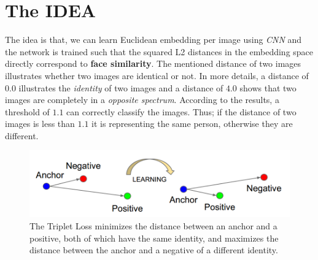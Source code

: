 \documentclass[journal, a4paper]{IEEEtran}
\begin{document}
\section{The IDEA}
	The idea is that, we can learn Euclidean embedding per image using \textit{CNN} and the network is trained such that the squared L2 distances in the embedding space directly correspond to \textbf{face similarity}. 	The mentioned distance of two images illustrates whether two images are identical or not. In more details, a distance of $0.0$ illustrates the \textit{identity} of two images and a distance of $4.0$ shows that two images are completely in a \textit{opposite spectrum}. According to the results, a threshold of $1.1$ can correctly classify the images. Thus; if the distance of two images is less than $1.1$ it is representing the same person, otherwise they are different.

	\begin{figure}[!hbt]
		\begin{center}
		\includegraphics[width=\columnwidth]{distant_satellites.PNG}
		\caption{The Triplet Loss minimizes the distance between an anchor and a positive, both of which have the same identity, and
			maximizes the distance between the anchor and a negative of a
			different identity.}
		\label{fig:tf_plot}
		\end{center}
	\end{figure}
\end{document}
